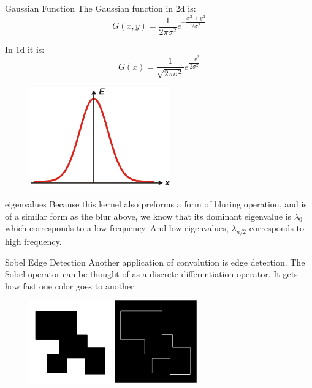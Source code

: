 \documentclass{beamer}
\begin{document}
\begin{frame}{Gaussian Function}
The Gaussian function in 2d is:
$$G(x,y) = \dfrac{1}{2\pi \sigma^2}e^{-\dfrac{x^2+y^2}{2 \sigma^2}}$$

In 1d it is:
$$ G(x) = \dfrac{1}{\sqrt{2\pi \sigma^2}}e^{\dfrac{-x^2}{2\sigma^2}}$$

\begin{figure}[ht]
\includegraphics[width=2.4in]{gauss.png}
\end{figure}
\end{frame}


\begin{frame} {eigenvalues}
Because this kernel also preforms a form of bluring operation, and is of a similar form as the blur above, we know that its dominant eigenvalue is $\lambda_0$ which corresponds to a low frequency. And low eigenvalues, $\lambda_{n/2}$ corresponds to high frequency.
\end{frame}


\begin{frame}{Sobel Edge Detection}
Another application of convolution is edge detection. The Sobel operator can be thought of as a discrete differentiation operator. It gets how fast one color goes to another. 

\begin{figure}[ht]
\includegraphics[width=1.4in]{edgein.png}
\hspace{.1in}
\includegraphics[width=1.4in]{edgeout.jpg}
\hspace{.1in}
\end{figure}
\end{frame}
\end{document}
